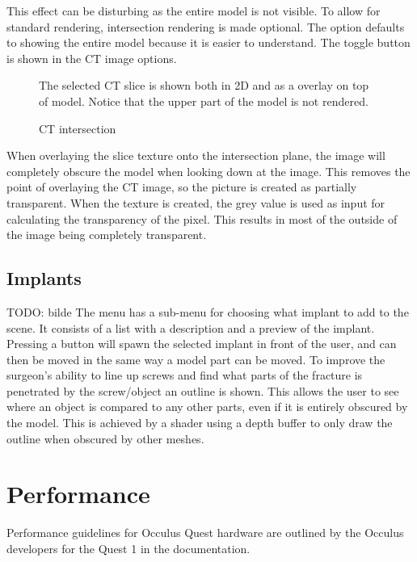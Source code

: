 \documentclass[a4paper]{report}
\begin{document}
This effect can be disturbing as the entire model is not visible. To allow for standard rendering, intersection rendering is made optional. The option defaults to showing the entire model because it is easier to understand.
The toggle button is shown in the CT image options.

\begin{figure}[h!]
    \centering
	\hfill
  \caption{CT intersection}
  \small
  The selected CT slice is shown both in 2D and as a overlay on top of model. Notice that the upper part of the model is not rendered.
\end{figure}

When overlaying the slice texture onto the intersection plane, the image will completely obscure the model when looking down at the image. This removes the point of overlaying the CT image, so the picture is created as partially transparent. When the texture is created, the grey value is used as input for calculating the transparency of the pixel. This results in most of the outside of the image being completely transparent.

\subsection{Implants}
TODO: bilde
The menu has a sub-menu for choosing what implant to add to the scene. It consists of a list with a description and a preview of the implant. Pressing a button will spawn the selected implant in front of the user, and can then be moved in the same way a model part can be moved.
To improve the surgeon's ability to line up screws and find what parts of the fracture is penetrated by the screw/object an outline is shown. This allows the user to see where an object is compared to any other parts, even if it is entirely obscured by the model. This is achieved by a shader using a depth buffer to only draw the outline when obscured by other meshes\cite{technologies_unity_nodate-1}.
\section{Performance}
Performance guidelines for Occulus Quest hardware are outlined by the Occulus developers for the Quest 1 in the documentation\cite{noauthor_oculus_nodate}.
\end{document}
